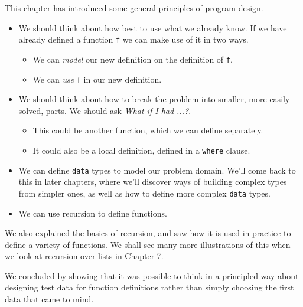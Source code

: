 \begin{summary}
This chapter has introduced some general principles of program design.
\begin{itemize}
\item We should think about how best to use what we already know. If we
have already defined a function \texttt{f} we can make use of it in two ways.
\begin{itemize}
\item[--] We can {\em model\/} our new definition on the
definition of \texttt{f}.
\item[--] We can {\em use\/} \texttt{f} in our new definition.
\end{itemize}
\item We should think about how to break the problem into smaller, more
easily solved, parts. We should ask {\em What if I had ...?}.
\begin{itemize}
\item[--] This could be another function, which we can define separately.
\item[--] It could also be a local definition, defined in a \texttt{where} clause.
\end{itemize}
\item We can define \texttt{data} types to model our problem domain. We'll come back to this in later chapters, where we'll discover ways of building complex types from simpler ones, as well as how to define more complex \texttt{data} types.
\item We can use recursion to define functions.
\end{itemize}
We also explained the basics of recursion, and saw how it is used in
practice to define a variety of functions. We shall see many more
illustrations of this when we look at recursion over lists in Chapter 7.

We concluded by showing that it was possible to think in a principled
way about designing
test data for function definitions rather than simply choosing the first
data that came to mind.
 \end{summary}

%

